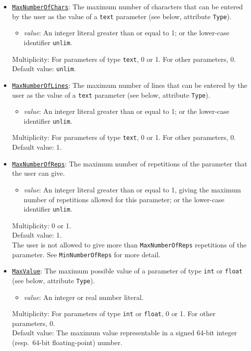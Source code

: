 \documentclass[11pt]{article}
\begin{document}
\begin{itemize}
\item \underline{\tt MaxNumberOfChars}:  The maximum number of characters
that can be entered by the user as the value of a {\tt text} parameter
(see below, attribute {\tt Type}).
\begin{itemize}
\item {\it value}:  An integer literal greater than or equal to 1;
  or the lower-case identifier \verb/unlim/.
\end{itemize}
Multiplicity: For parameters of type {\tt text}, 0 or 1.
For other parameters, 0. \\
Default value: {\tt unlim}.

\item \underline{\tt MaxNumberOfLines}:  The maximum number of lines that
can be entered by the user as the value of a {\tt text} parameter
(see below, attribute {\tt Type}).
\begin{itemize}
\item {\it value}:  An integer literal greater than or equal to 1;
  or the lower-case identifier \verb/unlim/.
\end{itemize}
Multiplicity: For parameters of type {\tt text}, 0 or 1.
For other parameters, 0. \\
Default value: 1.

\item \underline{\tt MaxNumberOfReps}:  The maximum number of
repetitions of the parameter that the user can give.
\begin{itemize}
\item {\it value}: An integer literal greater than or equal
  to 1, giving the
  maximum number of repetitions allowed for this parameter;
  or the lower-case identifier \verb/unlim/.
\end{itemize}
Multiplicity: 0 or 1. \\
Default value: 1. \\
The user is not allowed to give more than {\tt MaxNumberOfReps}
repetitions of the parameter.
See {\tt MinNumberOfReps} for more detail.

\item \underline{\tt MaxValue}:  The maximum possible value of
a parameter of type {\tt int} or {\tt float}
(see below, attribute {\tt Type}).
\begin{itemize}
\item {\it value}: An integer or real number literal.
\end{itemize}
Multiplicity:  For parameters of type {\tt int} or {\tt float}, 0 or 1.
For other parameters, 0. \\
Default value:  The maximum value representable in a signed 64-bit integer
(resp.\ 64-bit floating-point) number.


\end{itemize}
\end{document}
